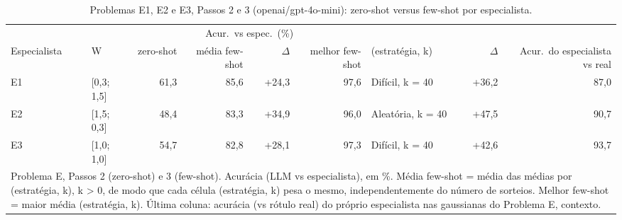 \begin{table}[htbp]
\centering
\small
\caption{Problemas E1, E2 e E3, Passos 2 e 3 (openai/gpt-4o-mini): zero-shot versus few-shot por especialista.}
\label{tab:bloco2_E_passo2_vs_passo3_gpt4mini}
\begin{tabular}{llrrrrlrr}
\toprule
 &  & \multicolumn{4}{c}{Acur.\ vs espec.\ (\%)} &  &  &  \\ \cmidrule(lr){3-6}
Especialista & W & zero-shot & média few-shot & $\Delta$ & melhor few-shot & (estratégia, k) & $\Delta$ & Acur.\ do especialista vs real \\
\midrule
E1 & [0,3; 1,5] & 61,3 & 85,6 & +24,3 & 97,6 & Difícil, k = 40 & +36,2 & 87,0 \\
E2 & [1,5; 0,3] & 48,4 & 83,3 & +34,9 & 96,0 & Aleatória, k = 40 & +47,5 & 90,7 \\
E3 & [1,0; 1,0] & 54,7 & 82,8 & +28,1 & 97,3 & Difícil, k = 40 & +42,6 & 93,7 \\
\bottomrule
\multicolumn{9}{p{0.95\linewidth}}{\footnotesize Problema E, Passos 2 (zero-shot) e 3 (few-shot). Acurácia (LLM vs especialista), em \%. Média few-shot = média das médias por (estratégia, k), k > 0, de modo que cada célula (estratégia, k) pesa o mesmo, independentemente do número de sorteios. Melhor few-shot = maior média (estratégia, k). Última coluna: acurácia (vs rótulo real) do próprio especialista nas gaussianas do Problema E, contexto.} \\
\end{tabular}
\end{table}
